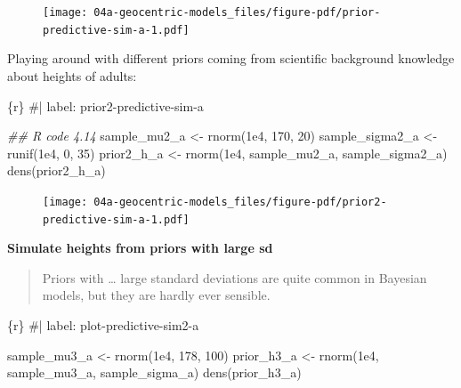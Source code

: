 \documentclass[
  letterpaper,
  DIV=11,
  numbers=noendperiod]{scrreprt}
\newenvironment{Shaded}{\begin{snugshade}}{\end{snugshade}}
\newcommand{\CommentTok}[1]{\textcolor[rgb]{0.37,0.37,0.37}{#1}}
\newcommand{\DecValTok}[1]{\textcolor[rgb]{0.68,0.00,0.00}{#1}}
\newcommand{\DocumentationTok}[1]{\textcolor[rgb]{0.37,0.37,0.37}{\textit{#1}}}
\newcommand{\FloatTok}[1]{\textcolor[rgb]{0.68,0.00,0.00}{#1}}
\newcommand{\FunctionTok}[1]{\textcolor[rgb]{0.28,0.35,0.67}{#1}}
\newcommand{\InformationTok}[1]{\textcolor[rgb]{0.37,0.37,0.37}{#1}}
\newcommand{\NormalTok}[1]{\textcolor[rgb]{0.00,0.23,0.31}{#1}}
\newcommand{\OtherTok}[1]{\textcolor[rgb]{0.00,0.23,0.31}{#1}}
\begin{document}
\begin{figure}[H]

{\centering \texttt{[image: 04a-geocentric-models\_files/figure-pdf/prior-predictive-sim-a-1.pdf]}

}

\end{figure}

Playing around with different priors coming from scientific background
knowledge about heights of adults:

\begin{Shaded}
\begin{Highlighting}[]
\InformationTok{\textasciigrave{}\textasciigrave{}\textasciigrave{}\{r\}}
\CommentTok{\#| label: prior2{-}predictive{-}sim{-}a}

\DocumentationTok{\#\# R code 4.14}
\NormalTok{sample\_mu2\_a }\OtherTok{\textless{}{-}} \FunctionTok{rnorm}\NormalTok{(}\FloatTok{1e4}\NormalTok{, }\DecValTok{170}\NormalTok{, }\DecValTok{20}\NormalTok{)}
\NormalTok{sample\_sigma2\_a }\OtherTok{\textless{}{-}} \FunctionTok{runif}\NormalTok{(}\FloatTok{1e4}\NormalTok{, }\DecValTok{0}\NormalTok{, }\DecValTok{35}\NormalTok{)}
\NormalTok{prior2\_h\_a }\OtherTok{\textless{}{-}} \FunctionTok{rnorm}\NormalTok{(}\FloatTok{1e4}\NormalTok{, sample\_mu2\_a, sample\_sigma2\_a)}
\FunctionTok{dens}\NormalTok{(prior2\_h\_a)}
\InformationTok{\textasciigrave{}\textasciigrave{}\textasciigrave{}}
\end{Highlighting}
\end{Shaded}

\begin{figure}[H]

{\centering \texttt{[image: 04a-geocentric-models\_files/figure-pdf/prior2-predictive-sim-a-1.pdf]}

}

\end{figure}

\textbf{Simulate heights from priors with large sd}

\begin{quote}
Priors with \ldots{} large standard deviations are quite common in
Bayesian models, but they are hardly ever sensible.
\end{quote}

\begin{Shaded}
\begin{Highlighting}[]
\InformationTok{\textasciigrave{}\textasciigrave{}\textasciigrave{}\{r\}}
\CommentTok{\#| label: plot{-}predictive{-}sim2{-}a}

\NormalTok{sample\_mu3\_a }\OtherTok{\textless{}{-}} \FunctionTok{rnorm}\NormalTok{(}\FloatTok{1e4}\NormalTok{, }\DecValTok{178}\NormalTok{, }\DecValTok{100}\NormalTok{)}
\NormalTok{prior\_h3\_a }\OtherTok{\textless{}{-}} \FunctionTok{rnorm}\NormalTok{(}\FloatTok{1e4}\NormalTok{, sample\_mu3\_a, sample\_sigma\_a)}
\FunctionTok{dens}\NormalTok{(prior\_h3\_a)}
\InformationTok{\textasciigrave{}\textasciigrave{}\textasciigrave{}}
\end{Highlighting}
\end{Shaded}
\end{document}
